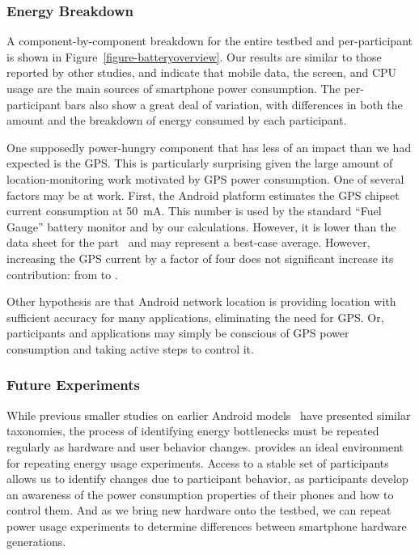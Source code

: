 \subsubsection{Energy Breakdown}

A component-by-component breakdown for the entire testbed and per-participant
is shown in Figure~\ref{figure-batteryoverview}. Our results are similar to
those reported by other studies, and indicate that mobile data, the screen,
and CPU usage are the main sources of smartphone power consumption. The
per-participant bars also show a great deal of variation, with differences in
both the amount and the breakdown of energy consumed by each participant.

One supposedly power-hungry component that has less of an impact than we had
expected is the GPS. This is particularly surprising given the large amount
of location-monitoring work motivated by GPS power consumption. One of
several factors may be at work. First, the Android platform estimates the GPS
chipset current consumption at 50~mA. This number is used by the standard
``Fuel Gauge'' battery monitor and by our calculations. However, it is lower
than the data sheet for the part~\cite{FIXME} and may represent a best-case
average. However, increasing the GPS current by a factor of four does not
significant increase its contribution: from  to .

Other hypothesis are that Android network location is providing location with
sufficient accuracy for many applications, eliminating the need for GPS. Or,
participants and applications may simply be conscious of GPS power
consumption and taking active steps to control it.

\subsubsection{Future Experiments}

While previous smaller studies on earlier Android
models~\cite{shye:micro:2009} have presented similar taxonomies, the process
of identifying energy bottlenecks must be repeated regularly as hardware and
user behavior changes. \PhoneLab{} provides an ideal environment for
repeating energy usage experiments. Access to a stable set of participants
allows us to identify changes due to participant behavior, as participants
develop an awareness of the power consumption properties of their phones and
how to control them. And as we bring new hardware onto the testbed, we can
repeat power usage experiments to determine differences between smartphone
hardware generations.
